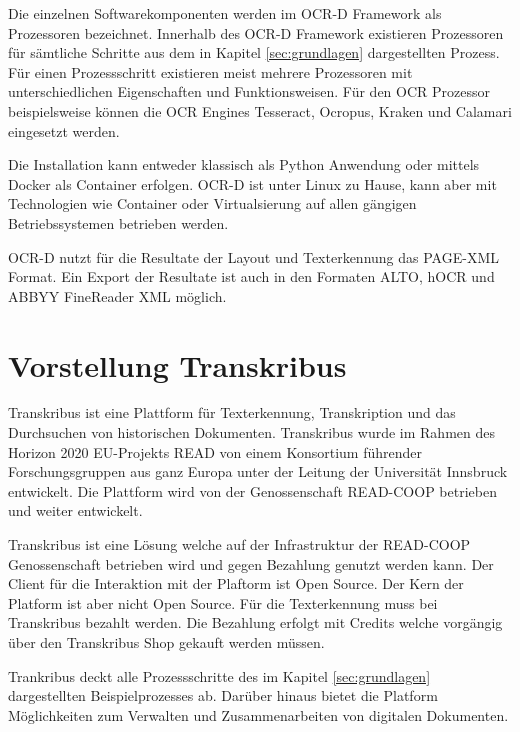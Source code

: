 \documentclass[a4paper,oneside, 12pt]{report}
\begin{document}
 Die einzelnen Softwarekomponenten werden im OCR-D Framework als Prozessoren bezeichnet. Innerhalb des OCR-D Framework existieren Prozessoren für sämtliche Schritte aus dem in Kapitel \ref{sec:grundlagen} dargestellten Prozess. Für einen Prozessschritt existieren meist mehrere Prozessoren mit unterschiedlichen Eigenschaften und Funktionsweisen. Für den \ac{OCR} Prozessor beispielsweise können die OCR Engines Tesseract, Ocropus, Kraken und Calamari eingesetzt werden. 

Die Installation kann entweder klassisch als Python Anwendung oder mittels Docker als Container erfolgen. OCR-D ist unter Linux zu Hause, kann aber mit Technologien wie Container oder Virtualsierung auf allen gängigen Betriebssystemen betrieben werden. \cite{ocrdsetup}

OCR-D nutzt für die Resultate der Layout und Texterkennung das PAGE-XML Format. Ein Export der Resultate ist auch in den Formaten ALTO, hOCR und ABBYY FineReader XML möglich. \cite{ocrdfaq}


\section{Vorstellung Transkribus}
Transkribus ist eine Plattform für Texterkennung, Transkription und das Durchsuchen von historischen Dokumenten. Transkribus wurde im Rahmen des Horizon 2020 EU-Projekts READ von einem Konsortium führender Forschungsgruppen aus ganz Europa unter der Leitung der Universität Innsbruck entwickelt. Die Plattform wird von der Genossenschaft READ-COOP betrieben und weiter entwickelt. \cite{readcoopabout} 

Transkribus ist eine Lösung welche auf der Infrastruktur der READ-COOP Genossenschaft betrieben wird und gegen Bezahlung genutzt werden kann. Der Client für die Interaktion mit der Plaftorm ist Open Source. Der Kern der Platform ist aber nicht Open Source. Für die Texterkennung muss bei Transkribus bezahlt werden. Die Bezahlung erfolgt mit Credits welche vorgängig über den Transkribus Shop gekauft werden müssen. \cite{transkribuspricing}

Trankribus deckt alle Prozessschritte des im Kapitel \ref{sec:grundlagen} dargestellten Beispielprozesses ab. Darüber hinaus bietet die Platform Möglichkeiten zum Verwalten und Zusammenarbeiten von digitalen Dokumenten. \cite{transkribus}
\end{document}
